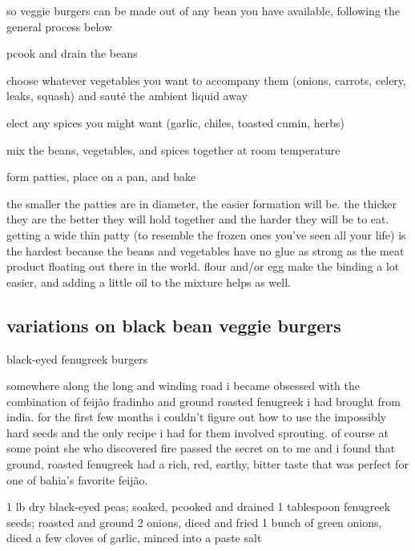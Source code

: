 so veggie burgers can be made out of any bean you have available, following the 
general process below

\begin{algorithm}
  \item pcook and drain the beans

  \item choose whatever vegetables you want to accompany them (onions, carrots, 
  celery, leaks, squash) and saut\'{e} the ambient liquid away

  \item elect any spices you might want (garlic, chiles, toasted cumin, herbs)

  \item mix the beans, vegetables, and spices together at room temperature

  \item form patties, place on a pan, and bake
\end{algorithm}

the smaller the patties are in diameter, the easier formation will be. the 
thicker they are the better they will hold together and the harder they will be 
to eat. getting a wide thin patty (to resemble the frozen ones you've seen all 
your life) is the hardest because the beans and vegetables have no glue as 
strong as the meat product floating out there in the world. flour and/or egg 
make the binding a lot easier, and adding a little oil to the mixture helps as 
well.

\subsection{variations on black bean veggie burgers}

black-eyed fenugreek burgers

somewhere along the long and winding road i became obsessed with the combination of feij\~{a}o fradinho and ground roasted fenugreek i had brought from india. for the first few months i couldn't figure out how to use the impossibly hard seeds and the only recipe i had for them involved sprouting. of course at some point she who discovered fire passed the secret on to me and i found that ground, roasted fenugreek had a rich, red, earthy, bitter taste that was perfect for one of bahia's favorite feij\~{a}o.

1 lb dry black-eyed peas; soaked, pcooked and drained
1 tablespoon fenugreek seeds; roasted and ground
2 onions, diced and fried
1 bunch of green onions, diced
a few cloves of garlic, minced into a paste
salt

